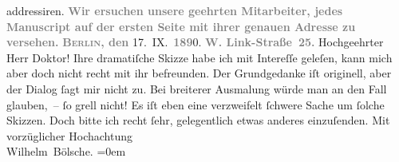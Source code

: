\begin{ledgroupsized}[t]{13cm}
{{                     addressiren.}}\pend
           \pstart
           \textcolor{gray}{\textbf{Wir ersuchen unsere geehrten Mitarbeiter, jedes Manuscript
                     auf der ersten Seite mit ihrer genauen Adresse zu versehen.}}\pend
           \pstart
           \raggedleft{}\textcolor{gray}{\textbf{\textsc{Berlin}, den}}{ }17. IX. \textcolor{gray}{\textbf{189}}0.\pend
           \pstart
           \noindent{}\raggedleft{}\textcolor{gray}{\textbf{W. Link-Straße 25.}}\pend
           \pstart\center{}Hochgeehrter Herr Doktor!\pend\pstart
           Ihre dramatiſche Skizze habe
               ich mit Intereſſe geleſen, kann mich aber doch nicht recht mit ihr befreunden. Der
               Grundgedanke iſt originell, aber der Dialog ſagt mir nicht zu. Bei breiterer
               Ausmalung würde man an den Fall glauben, – ſo grell nicht! Es iſt eben eine
               verzweifelt ſchwere Sache um ſolche Skizzen. Doch bitte ich recht ſehr, gelegentlich
               etwas anderes einzuſenden.\pend
           \pstart
           Mit vorzüglicher Hochachtung{\\[\baselineskip]}\spacefill\mbox{Wilhelm Bölsche.}\pend
           \leftskip=0em{}
         
         \endnumbering{}\end{ledgroupsized}  \newcommand{\dateiname}{L00004}\newcommand{\titel}{Wilhelm Bölsche an Arthur Schnitzler, 17. 9. 1890}\newcommand{\editorInnen}{Martin Anton Müller und Gerd-Hermann Susen}
      
